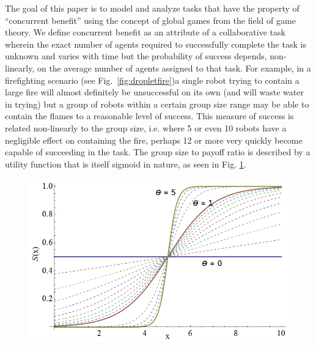 \documentclass[conference]{IEEEtran}
\begin{document}
The goal of this paper is to model and analyze tasks that have the property of ``concurrent benefit'' using the concept of global games from the field of game theory. We define concurrent benefit as an attribute of a collaborative task wherein the exact number of agents required to successfully complete the task is unknown and varies with time but the probability of success depends, non-linearly, on the average number of agents assigned to that task. For example, in a firefighting scenario (see Fig.~\ref{fig:dropletfire})a single robot trying to contain a large fire will almost definitely be unsuccessful on its own (and will waste water in trying) but a group of robots within a certain group size range may be able to contain the flames to a reasonable level of success. This measure of success is related non-linearly to the group size, i.e. where 5 or even 10 robots have a negligible effect on containing the fire, perhaps 12 or more very quickly become capable of succeeding in the task. The group size to payoff ratio is described by a utility function that is itself sigmoid in nature, as seen in Fig. \ref{fig:sigmoid}.

\begin{figure}[!ht]
\centering\includegraphics[width=\columnwidth]{../figures/sigmoid1.png}
\centering\caption{}\label{fig:sigmoid}
\end{figure}
\end{document}
